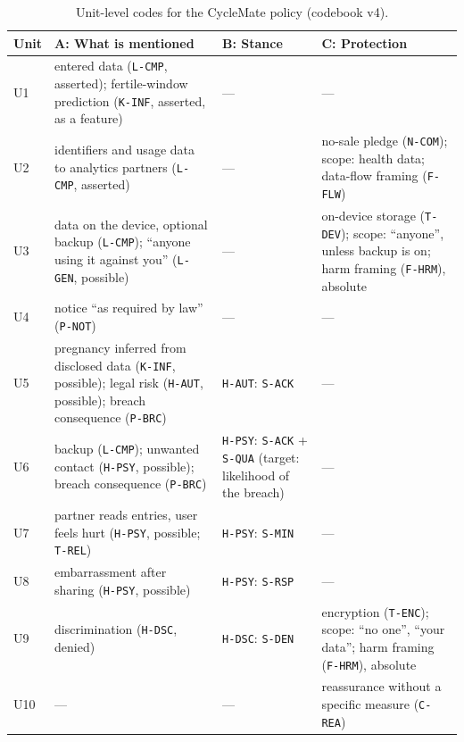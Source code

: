 \begin{table}[H]
\centering
\caption{Unit-level codes for the CycleMate policy (codebook v4).}
\label{tab:we-units}
\small
\begin{tabularx}{\textwidth}{@{}l>{\raggedright\arraybackslash}X
                                   >{\raggedright\arraybackslash}p{2.9cm}
                                   >{\raggedright\arraybackslash}X@{}}
\toprule
\textbf{Unit} & \textbf{A: What is mentioned} & \textbf{B: Stance} &
  \textbf{C: Protection} \\
\midrule
U1 & entered data (\texttt{L-CMP}, asserted); fertile-window prediction
     (\texttt{K-INF}, asserted, as a feature) & --- & --- \\
U2 & identifiers and usage data to analytics partners (\texttt{L-CMP},
     asserted) & --- & no-sale pledge (\texttt{N-COM}); scope: health data;
     data-flow framing (\texttt{F-FLW}) \\
U3 & data on the device, optional backup (\texttt{L-CMP}); \enquote{anyone
     using it against you} (\texttt{L-GEN}, possible) & ---
   & on-device storage (\texttt{T-DEV}); scope: \enquote{anyone}, unless
     backup is on; harm framing (\texttt{F-HRM}), absolute \\
U4 & notice \enquote{as required by law} (\texttt{P-NOT}) & --- & --- \\
U5 & pregnancy inferred from disclosed data (\texttt{K-INF}, possible); legal
     risk (\texttt{H-AUT}, possible); breach consequence (\texttt{P-BRC})
   & \texttt{H-AUT}: \texttt{S-ACK} & --- \\
U6 & backup (\texttt{L-CMP}); unwanted contact (\texttt{H-PSY}, possible);
     breach consequence (\texttt{P-BRC})
   & \texttt{H-PSY}: \texttt{S-ACK} + \texttt{S-QUA} (target: likelihood of
     the breach) & --- \\
U7 & partner reads entries, user feels hurt (\texttt{H-PSY}, possible;
     \texttt{T-REL}) & \texttt{H-PSY}: \texttt{S-MIN} & --- \\
U8 & embarrassment after sharing (\texttt{H-PSY}, possible)
   & \texttt{H-PSY}: \texttt{S-RSP} & --- \\
U9 & discrimination (\texttt{H-DSC}, denied) & \texttt{H-DSC}: \texttt{S-DEN}
   & encryption (\texttt{T-ENC}); scope: \enquote{no one}, \enquote{your
     data}; harm framing (\texttt{F-HRM}), absolute \\
U10 & --- & --- & reassurance without a specific measure (\texttt{C-REA}) \\
\bottomrule
\end{tabularx}
\end{table}

